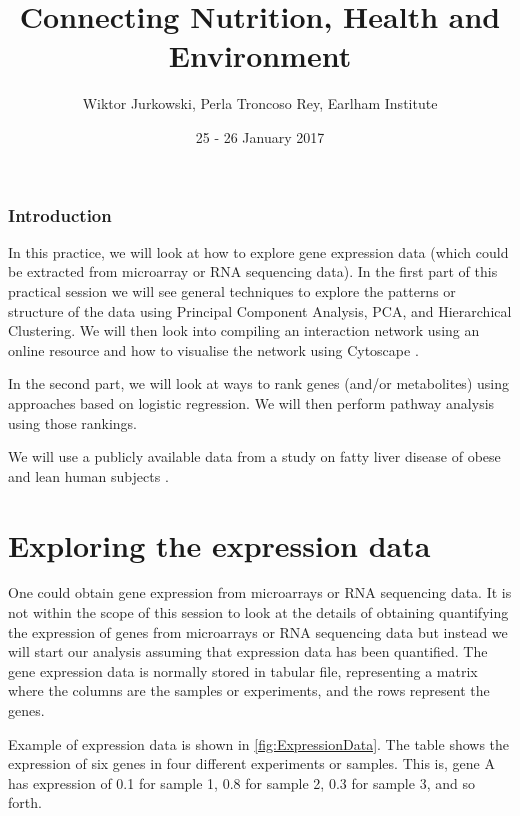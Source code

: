 \documentclass[11pt, oneside]{article}   	%
\title{Connecting Nutrition, Health and Environment }
\author{Wiktor Jurkowski, Perla Troncoso Rey, Earlham Institute}
\date{25 - 26 January 2017}	 %
\begin{document}
\maketitle

\tableofcontents

\listoffigures
\listoftables


\section{Introduction}

In this practice, we will look at how to explore  gene expression data (which could be extracted from microarray or RNA sequencing data). In the first part of this practical session we will see general techniques to explore the patterns or structure of the data using Principal Component Analysis, PCA, and Hierarchical Clustering. We will then look into compiling an interaction network using an online resource and how to visualise the network using Cytoscape \cite{Shannon2003} \cite{Smoot2011}.

In the second part, we will look at ways to rank genes (and/or metabolites) using approaches based on logistic regression. We will then perform pathway analysis using those rankings.

We will use a publicly available data from a study on fatty liver disease of obese and lean human subjects \cite{Wruck2015}.



\part{Exploring the expression data}

One could obtain gene expression from microarrays or RNA sequencing data. It is not within the scope of this session to look at the details of obtaining quantifying the expression of genes from microarrays or RNA sequencing data but instead we will start our analysis assuming that expression data has been quantified.
The gene expression data is normally stored in tabular file, representing a matrix where the columns are the samples or experiments, and the rows represent the genes. 

Example of expression data is shown in \autoref{fig:ExpressionData}. The table shows the expression of six genes in four different experiments or samples. This is, gene A has expression of 0.1 for sample 1, 0.8 for sample 2, 0.3 for sample 3, and so forth. 
\end{document}
